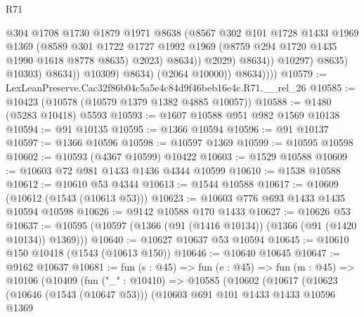 \begin{lexlean}{R71}
\begin{coremodule}
                                    @304
                                    @1708
                                    @1730
                                    @1879
                                    @1971
                                    @8638
                                    (@8567
                                      @302
                                      @101
                                      @1728
                                      @1433
                                      @1969
                                      @1369
                                      (@8589
                                        @301
                                        @1722
                                        @1727
                                        @1992
                                        @1969
                                        (@8759 @294 @1720 @1435 @1990 @1618 @8778 @8635)
                                        @2023)
                                      @8634))
                                  @2029)
                                @8634))
                            @10297)
                          @8635)
                        @10303)
                      @8634))
                  @10309)
                @8634)
              (@2064 @10000))
            @8634))))
@10579 := LexLeanPreserve.Cac32f86b04c5a5e4c84d9f46beb16e4c.R71.__rel_26
@10585 := @10423 (@10578 (@10579 @1379 @1382 @4885 @10057))
@10588 := @1480 (@5283 @10418) @5593
@10593 := @1607 @10588 @951 @982 @1569 @10138
@10594 := @91 @10135
@10595 := @1366 @10594
@10596 := @91 @10137
@10597 := @1366 @10596
@10598 := @10597 @1369
@10599 := @10595 @10598
@10602 := @10593 (@4367 @10599) @10422
@10603 := @1529 @10588
@10609 := @10603 @72 @981 @1433 @1436 @4344 @10599
@10610 := @1538 @10588
@10612 := @10610 @53 @4344
@10613 := @1544 @10588
@10617 := @10609 (@10612 (@1543 (@10613 @53)))
@10623 := @10603 @776 @693 @1433 @1435 @10594 @10598
@10626 := @9142 @10588 @170 @1433
@10627 := @10626 @53
@10637 := @10595 (@10597 (@1366 (@91 (@1416 @10134)) (@1366 (@91 (@1420 @10134)) @1369)))
@10640 := @10627 @10637 @53 @10594
@10645 := @10610 @150 @10418 (@1543 (@10613 @150))
@10646 := @10640 @10645
@10647 := @9162 @10637
@10681 := fun (s : @45) =>
  fun (e : @45) =>
  fun (m : @45) =>
  @10106
    (@10409
      (fun ("_" : @10410) =>
      @10585
        (@10602
          (@10617
            (@10623
              (@10646 (@1543 (@10647 @53)))
              (@10603
                @691
                @101
                @1433
                @1433
                @10596
                @1369

\end{coremodule}
\end{lexlean}
